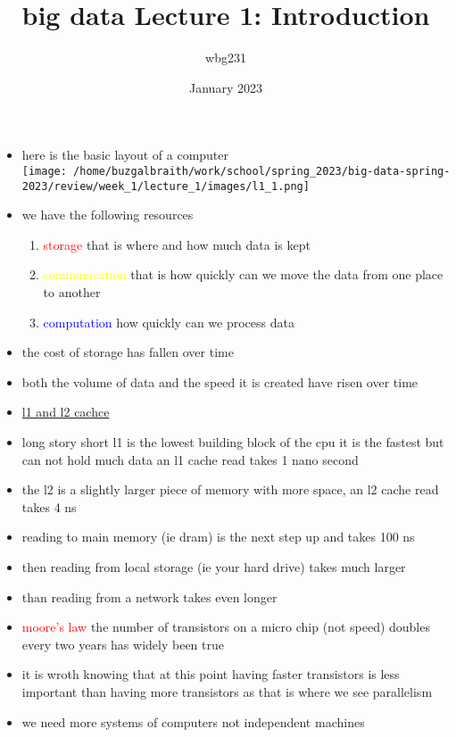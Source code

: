 \documentclass{article}
\title{big data Lecture 1: Introduction}
\author{wbg231 }
\date{January 2023}
\begin{document}
\maketitle

\begin{itemize}
    \section{big data background}
    \item here is the basic layout of a computer 
  \\  \texttt{[image: /home/buzgalbraith/work/school/spring\_2023/big-data-spring-2023/review/week\_1/lecture\_1/images/l1\_1.png]} 
  \item we have the following resources 
  \begin{enumerate}
    \item \textcolor{red}{storage} that is where and how much data is kept
    \item \textcolor{yellow}{communication} that is how quickly can we move the data from one place to another 
    \item \textcolor{blue}{computation} how quickly can we process data 
  \end{enumerate}
  \item the cost of storage has fallen over time 
  \item both the volume of data and the speed it is created have risen over time 
  \item \href{https://www.hardwaretimes.com/difference-between-l1-l2-and-l3-cache-how-does-cpu-cache-work/}{l1 and l2 cachce} 
  \item long story short l1 is the lowest building block of the cpu it is the fastest but can not hold much data an l1 cache read takes 1 nano second 
  \item the l2 is a slightly larger piece of memory with more space, an l2 cache read takes 4 ns
  \item reading to main memory (ie dram) is the next step up and takes 100 ns 
  \item then reading from local storage (ie your hard drive) takes much larger
  \item than reading from a network takes even longer 
  \item \textcolor{red}{moore's law} the number of transistors on a micro chip (not speed) doubles every two years has widely been true 
  \item  it is wroth knowing that at this point having faster transistors is less important than having more transistors as that is where we see parallelism 
  \item we need more systems of computers not independent machines 

\end{itemize}
\end{document}
